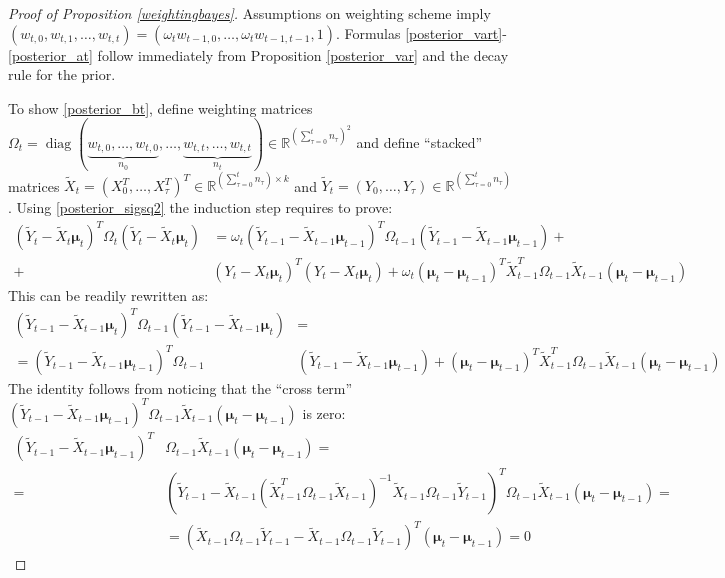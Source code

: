 \documentclass[10pt,fleqn]{amsart}
\theoremstyle{definition}
\theoremstyle{remark}
\numberwithin{equation}{section}
\newcommand{\RR}{\mathbb{R}}
\newcommand{\mmu}{\boldsymbol{\mu}}
\newcommand{\Xtot}{\widetilde{X}_t}
\newcommand{\Ytot}{\widetilde{Y}_t}
\newcommand{\Xtott}[1]{\widetilde X_{#1}}
\newcommand{\Ytott}[1]{\widetilde Y_{#1}}
\begin{document}
\begin{proof}[Proof of Proposition \ref{weightingbayes}]
Assumptions on weighting scheme imply $\left(w_{t,0},w_{t,1},\ldots,w_{t,t}\right)=\left(\omega_t w_{t-1,0},\ldots,\omega_t w_{t-1,t-1},1\right)$.
Formulas \ref{posterior_vart}-\ref{posterior_at} follow immediately from Proposition \ref{posterior_var} and the decay rule for the prior.

To show \ref{posterior_bt}, define weighting matrices
$\displaystyle\Omega_t=\operatorname{diag}\left(\underbrace{w_{t,0},\ldots,w_{t,0}}_{n_0},\ldots,\underbrace{w_{t,t},\ldots,w_{t,t}}_{n_t}\right)
\in\RR^{\left(\sum_{\tau=0}^t n_\tau\right)^2}$ and define ``stacked'' matrices $\Xtot=\left(X_0^T,\ldots,X_\tau^T\right)^T\in\RR^{\left(\sum_{\tau=0}^t n_\tau\right)\times k}$
and $\Ytot=\left(Y_0,\ldots,Y_\tau\right)\in\RR^{\left(\sum_{\tau=0}^t n_\tau\right)}$.
Using \ref{posterior_sigsq2} the induction step requires to prove:
\begin{equation*}\begin{split}
    \left(\Ytot-\Xtot\mmu_t\right)^T\Omega_t\left(\Ytot-\Xtot\mmu_t\right)&=
    \omega_t\left(\Ytott{t-1}-\Xtott{t-1}\mmu_{t-1}\right)^T\Omega_{t-1}\left(\Ytott{t-1}-\Xtott{t-1}\mmu_{t-1}\right)+\\
    +&\left(Y_t-X_t\mmu_t\right)^T\left(Y_t-X_t\mmu_t\right)+
    \omega_t\left(\mmu_t-\mmu_{t-1}\right)^T\Xtott{t-1}^T\Omega_{t-1}\Xtott{t-1}\left(\mmu_t-\mmu_{t-1}\right)
\end{split}\end{equation*}
This can be readily rewritten as:
\begin{equation*}\begin{split}
    \left(\Ytott{t-1}-\Xtott{t-1}\mmu_t\right)^T\Omega_{t-1}\left(\Ytott{t-1}-\Xtott{t-1}\mmu_t\right)&=\\
    =\left(\Ytott{t-1}-\Xtott{t-1}\mmu_{t-1}\right)^T\Omega_{t-1}&\left(\Ytott{t-1}-\Xtott{t-1}\mmu_{t-1}\right)+
    \left(\mmu_t-\mmu_{t-1}\right)^T\Xtott{t-1}^T\Omega_{t-1}\Xtott{t-1}\left(\mmu_t-\mmu_{t-1}\right)    
\end{split}\end{equation*}
The identity follows from noticing that the ``cross term''
$\left(\Ytott{t-1}-\Xtott{t-1}\mmu_{t-1}\right)^T\Omega_{t-1}\Xtott{t-1}\left(\mmu_t-\mmu_{t-1}\right)$ is zero:
\begin{equation*}\begin{split}
    \left(\Ytott{t-1}-\Xtott{t-1}\mmu_{t-1}\right)^T&\Omega_{t-1}\Xtott{t-1}\left(\mmu_t-\mmu_{t-1}\right)=\\
    =&\left(\Ytott{t-1}-\Xtott{t-1}\left(\Xtott{t-1}^T\Omega_{t-1}\Xtott{t-1}\right)^{-1}\Xtott{t-1}\Omega_{t-1}\Ytott{t-1}\right)^T\Omega_{t-1}\Xtott{t-1}\left(\mmu_t-\mmu_{t-1}\right)=\\
    &=\left(\Xtott{t-1}\Omega_{t-1}\Ytott{t-1}-\Xtott{t-1}\Omega_{t-1}\Ytott{t-1}\right)^T\left(\mmu_t-\mmu_{t-1}\right)=0
\end{split}\end{equation*}
\end{proof}
\end{document}
